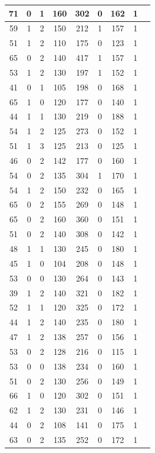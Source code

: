 \documentclass{article}
\begin{document}
\begin{longtable}{
|
c|c|c|c|c|c|c|c|c|}
71 & 0 & 1 & 160 & 302 & 0 & 162 & 1 \\
\hline
59 & 1 & 2 & 150 & 212 & 1 & 157 & 1 \\
\hline
51 & 1 & 2 & 110 & 175 & 0 & 123 & 1 \\
\hline
65 & 0 & 2 & 140 & 417 & 1 & 157 & 1 \\
\hline
53 & 1 & 2 & 130 & 197 & 1 & 152 & 1 \\
\hline
41 & 0 & 1 & 105 & 198 & 0 & 168 & 1 \\
\hline
65 & 1 & 0 & 120 & 177 & 0 & 140 & 1 \\
\hline
44 & 1 & 1 & 130 & 219 & 0 & 188 & 1 \\
\hline
54 & 1 & 2 & 125 & 273 & 0 & 152 & 1 \\
\hline
51 & 1 & 3 & 125 & 213 & 0 & 125 & 1 \\
\hline
46 & 0 & 2 & 142 & 177 & 0 & 160 & 1 \\
\hline
54 & 0 & 2 & 135 & 304 & 1 & 170 & 1 \\
\hline
54 & 1 & 2 & 150 & 232 & 0 & 165 & 1 \\
\hline
65 & 0 & 2 & 155 & 269 & 0 & 148 & 1 \\
\hline
65 & 0 & 2 & 160 & 360 & 0 & 151 & 1 \\
\hline
51 & 0 & 2 & 140 & 308 & 0 & 142 & 1 \\
\hline
48 & 1 & 1 & 130 & 245 & 0 & 180 & 1 \\
\hline
45 & 1 & 0 & 104 & 208 & 0 & 148 & 1 \\
\hline
53 & 0 & 0 & 130 & 264 & 0 & 143 & 1 \\
\hline
39 & 1 & 2 & 140 & 321 & 0 & 182 & 1 \\
\hline
52 & 1 & 1 & 120 & 325 & 0 & 172 & 1 \\
\hline
44 & 1 & 2 & 140 & 235 & 0 & 180 & 1 \\
\hline
47 & 1 & 2 & 138 & 257 & 0 & 156 & 1 \\
\hline
53 & 0 & 2 & 128 & 216 & 0 & 115 & 1 \\
\hline
53 & 0 & 0 & 138 & 234 & 0 & 160 & 1 \\
\hline
51 & 0 & 2 & 130 & 256 & 0 & 149 & 1 \\
\hline
66 & 1 & 0 & 120 & 302 & 0 & 151 & 1 \\
\hline
62 & 1 & 2 & 130 & 231 & 0 & 146 & 1 \\
\hline
44 & 0 & 2 & 108 & 141 & 0 & 175 & 1 \\
\hline
63 & 0 & 2 & 135 & 252 & 0 & 172 & 1 \\

\end{longtable}
\end{document}
